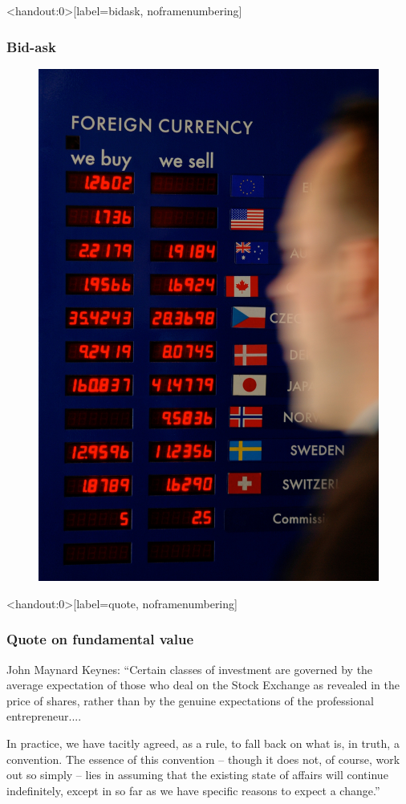 \documentclass[english,10pt]{beamer}
\theoremstyle{definition}
\begin{document}
\begin{frame}<handout:0>[label=bidask, noframenumbering]
\frametitle{Bid-ask}
	\begin{figure}
	\includegraphics[width=.3\paperwidth]{pics/Image_XRates}
	\end{figure}
	\hyperlink{main2}{}
\end{frame}


\begin{frame}<handout:0>[label=quote, noframenumbering]
\frametitle{Quote on fundamental value}
	John Maynard Keynes:
	``Certain classes of investment are governed by the average expectation of those who deal on the Stock Exchange as revealed in the price of shares, rather than by the genuine expectations of the professional entrepreneur.... 
	
	\quad
	
	In practice, we have tacitly agreed, as a rule, to fall back on what is, in truth, a convention. The essence of this convention -- though it does not, of course, work out so simply -- lies in assuming that the existing state of affairs will continue indefinitely, except in so far as we have specific reasons to expect a change.''
	\hyperlink{main4}{}
\end{frame}
\end{document}
